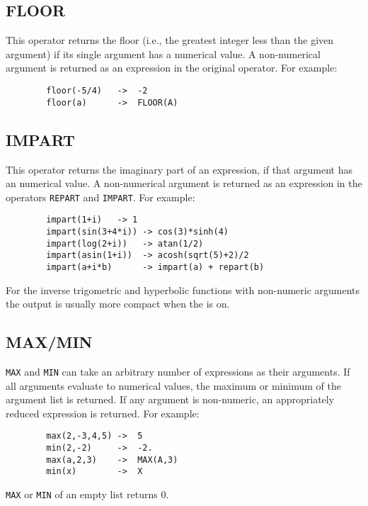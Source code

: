 \subsection{FLOOR}
\hypertarget{operator:FLOOR}{}
This operator returns the floor (i.e., the greatest integer less than
the given argument) if its single argument has a numerical value.  A
non-numerical argument is returned as an expression in the original
operator.  For example:

\begin{verbatim}
        floor(-5/4)   ->  -2
        floor(a)      ->  FLOOR(A)
\end{verbatim}

\subsection{IMPART}
\hypertarget{operator:IMPART}{}
This operator returns the imaginary part of an expression, if that argument
has an numerical value.  A non-numerical argument is returned as an expression
in the operators \texttt{REPART} and \texttt{IMPART}.  For example:
\begin{verbatim}
        impart(1+i)   -> 1
        impart(sin(3+4*i)) -> cos(3)*sinh(4)
        impart(log(2+i))   -> atan(1/2)
        impart(asin(1+i))  -> acosh(sqrt(5)+2)/2
        impart(a+i*b)      -> impart(a) + repart(b)
\end{verbatim}

For the inverse trigometric and hyperbolic functions with non-numeric arguments the output is usually more compact when the  is on.

\subsection{MAX/MIN}
\hypertarget{operator:MAX}{}
\hypertarget{operator:MIN}{}

\texttt{MAX} and \texttt{MIN} can take an arbitrary
number of expressions as their arguments.  If all arguments evaluate to
numerical values, the maximum or minimum of the argument list is returned.
If any argument is non-numeric, an appropriately reduced expression is
returned.  For example:
\begin{verbatim}
        max(2,-3,4,5) ->  5
        min(2,-2)     ->  -2.
        max(a,2,3)    ->  MAX(A,3)
        min(x)        ->  X
\end{verbatim}
\texttt{MAX} or \texttt{MIN} of an empty list returns 0.

